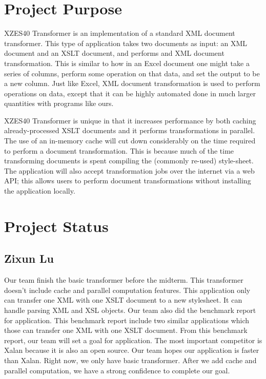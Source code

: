 \section{Project Purpose}

XZES40 Transformer is an implementation of a standard XML document transformer.
This type of application takes two documents as input: an XML document and an XSLT document, and performs and XML document transformation.
This is similar to how in an Excel document one might take a series of columns, perform some operation on that data, and set the output to be a new column.
Just like Excel, XML document transformation is used to perform operations on data, except that it can be highly automated done in much larger quantities with programs like ours.

XZES40 Transformer is unique in that it increases performance by both caching already-processed XSLT documents and it performs transformations in parallel.
The use of an in-memory cache will cut down considerably on the time required to perform a document transformation.
This is because much of the time transforming documents is spent compiling the (commonly re-used) style-sheet.
The application will also accept transformation jobs over the internet via a web API; this allows users to perform document transformations without installing the application locally.

\section{Project Status}

\subsection{Zixun Lu}

Our team finish the basic transformer before the midterm. 
This transformer doesn’t include cache and parallel computation features. 
This application only can transfer one XML with one XSLT document to a new stylesheet. 
It can handle parsing XML and XSL objects. 
Our team also did the benchmark report for application. 
This benchmark report include two similar applications which those can transfer one XML with one XSLT document. 
From this benchmark report, our team will set a goal for application. 
The most important competitor is Xalan because it is also an open source. 
Our team hopes our application is faster than Xalan. 
Right now, we only have basic transformer. 
After we add cache and parallel computation, we have a strong confidence to complete our goal.

